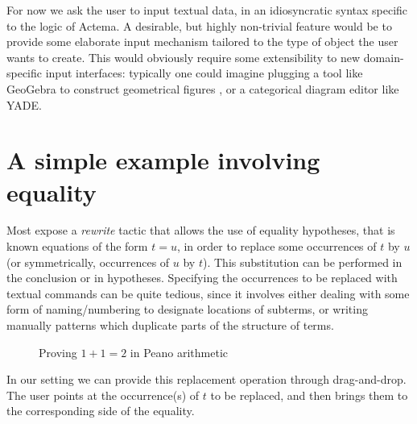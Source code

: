 For now we ask the user to input textual data, in an idiosyncratic syntax
specific to the logic of Actema. A desirable, but highly non-trivial feature
would be to provide some elaborate input mechanism tailored to the type of
object the user wants to create. This would obviously require some extensibility
to new domain-specific input interfaces: typically one could imagine plugging a
tool like GeoGebra to construct geometrical figures , or a
categorical diagram editor like YADE.


\section{A simple example involving equality}

Most  expose a \emph{rewrite} tactic that allows the
use of equality hypotheses, that is known equations of the form $t = u$, in
order to replace some occurrences of $t$ by $u$ (or symmetrically, occurrences
of $u$ by $t$). This substitution can be performed in the conclusion or in
hypotheses. Specifying the occurrences to be replaced with textual commands can
be quite tedious, since it involves either dealing with some form of
naming/numbering to designate locations of subterms, or writing manually
patterns which duplicate parts of the structure of terms.

\begin{figure*}
  \begin{center}
  \end{center}
  \caption{Proving $1 + 1 = 2$ in Peano arithmetic}
\end{figure*}

In our setting we can provide this replacement operation through
drag-and-drop. The user points at the occurrence(s) of $t$ to be
replaced, and then brings them to the corresponding side of the
equality.

